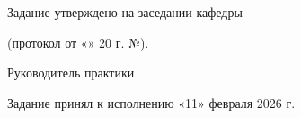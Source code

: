 \vspace{1.5em}

\noindent Задание утверждено на заседании кафедры \underline{\hspace{7cm}}

\noindent (протокол от «\underline{\hspace{0.8cm}}» \underline{\hspace{3cm}} 20\underline{\hspace{0.5cm}} г. №\underline{\hspace{1cm}}).

\vspace{1em}

\noindent Руководитель практики \hfill \underline{\hspace{3cm}} \hfill \SupervisorName

\vspace{1.5em}

\noindent Задание принял к исполнению «11» февраля 2026 г.

\vspace{1.5em}

\noindent\hfill \underline{\hspace{4cm}} \hfill \StudentName
